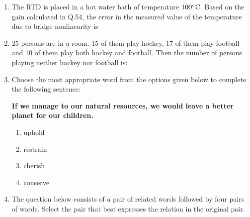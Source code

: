 \documentclass[journal,12pt,onecolumn]{IEEEtran}
\theoremstyle{remark}
\begin{document}
\begin{enumerate}
\item The RTD is placed in a hot water bath of temperature $100\degree$C. Based on the gain calculated in Q.54, the error in the measured value of the temperature due to bridge nonlinearity is

\hfill{}\begin{enumerate}  \end{enumerate}



\item 25 persons are in a room. 15 of them play hockey, 17 of them play football and 10 of them play both hockey and football. Then the number of persons playing neither hockey nor football is:

\hfill{}
\begin{enumerate} 
\end{enumerate}



\item Choose the most appropriate word from the options given below to complete the following sentence:

\textbf{If we manage to \underline{\hspace{2cm}} our natural resources, we would leave a better planet for our children.}

\hfill{}
\begin{enumerate}
    \item uphold
    \item restrain
    \item cherish
    \item conserve
\end{enumerate}



\item The question below consists of a pair of related words followed by four pairs of words. Select the pair that best expresses the relation in the original pair. 


\end{enumerate}
\end{document}

